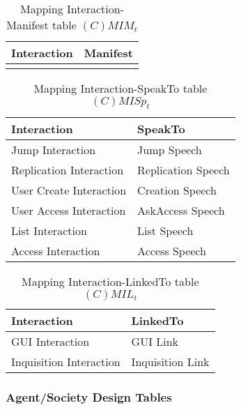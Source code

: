 \begin{table}[H]
	\centering
	\begin{tabular}{|p{4cm}|p{8cm}|}
			\hline
			\textbf{Interaction} & \textbf{Manifest} \\
			\hline
			& \\
			\hline
		\end{tabular}
	\caption{Mapping Interaction-Manifest table $(C)MIM_t$}
	\label{tab:cmimt}
\end{table}

\begin{table}[H]
	\centering
	\begin{tabular}{|p{4cm}|p{8cm}|}
			\hline
			\textbf{Interaction} & \textbf{SpeakTo} \\
			\hline
			Jump Interaction & Jump Speech \\
			\hline
			Replication Interaction & Replication Speech \\
			\hline
			User Create Interaction & Creation Speech \\
			\hline
			User Access Interaction & AskAccess Speech \\
			\hline
			List Interaction & List Speech \\
			\hline
			Access Interaction & Access Speech \\
			\hline
		\end{tabular}
	\caption{Mapping Interaction-SpeakTo table $(C)MISp_t$}
	\label{tab:cmispt}
\end{table}

\begin{table}[H]
	\centering
	\begin{tabular}{|p{4cm}|p{8cm}|}
			\hline
			\textbf{Interaction} & \textbf{LinkedTo} \\
			\hline
			GUI Interaction & GUI Link\\
			\hline
			Inquisition Interaction & Inquisition Link\\
			\hline
		\end{tabular}
	\caption{Mapping Interaction-LinkedTo table $(C)MIL_t$}
	\label{tab:cmilt}
\end{table}

\subsubsection{Agent/Society Design Tables}


